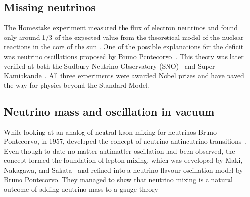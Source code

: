 \subsection{Missing neutrinos}\label{subsection:Missing}

The Homestake experiment measured the flux of electron neutrinos and found only around 1/3 of the expected value from the theoretical model of the nuclear reactions in the core of the sun \cite{9Davis}. One of the possible explanations for the deficit was neutrino oscillations proposed by Bruno Pontecorvo~\cite{11Pontecorvo}. This theory was later verified at both the Sudbury Neutrino Observatory (SNO)~\cite{Fix6} and Super-Kamiokande~\cite{10Fukuda}. All three experiments were awarded Nobel prizes and have paved the way for physics beyond the Standard Model.

\subsection{Neutrino mass and oscillation in vacuum}\label{subsection:Neutrinomassandoscillation}
While looking at an analog of neutral kaon mixing for neutrinos Bruno Pontecorvo, in 1957, developed the concept of neutrino-antineutrino transitions~\cite{11Pontecorvo}. Even though to date no matter-antimatter oscillation had been observed, the concept formed the foundation of lepton mixing, which was developed by Maki, Nakagawa, and Sakata~\cite{12Maki} and refined into a neutrino flavour oscillation model by Bruno Pontecorvo. They managed to show that neutrino mixing is a natural outcome of adding neutrino mass to a gauge theory~\cite{11Pontecorvo}

